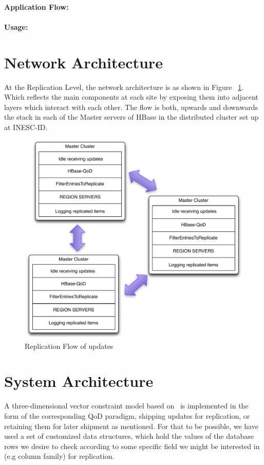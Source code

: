 \paragraph{Application Flow:}



\paragraph{Usage:}



\section{Network Architecture}
At the Replication Level, the network architecture is as shown in Figure ~\ref{fig-replication-level}. Which reflects the main components at each site by exposing them into adjacent layers which interact with each other. The flow is both, upwards and downwards the stack in each of the Master servers of HBase in the distributed cluster set up at INESC-ID.

\begin{figure}[t]
\centering
\includegraphics[width=0.8\linewidth]{figs/ReplicationFlow.pdf}
\caption{Replication Flow of updates}
\label{fig-replication-level}
\end{figure}

\section{System Architecture}
A three-dimensional vector constraint model based on~\cite{Santos:2010} is implemented in the form of the corresponding QoD paradigm, shipping updates for replication, or retaining them for later shipment as mentioned. For that to be possible, we have used a set of customized data structures, which hold the values of the database rows we desire to check according to some specific field we might be interested in (e.g column family) for replication. 

